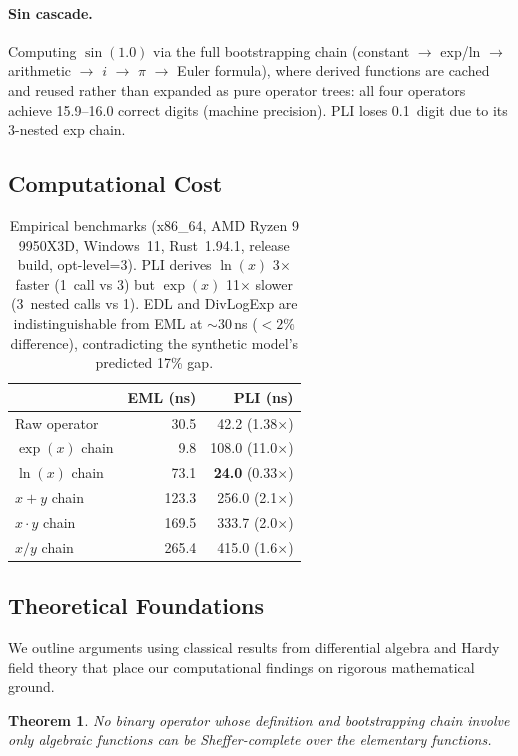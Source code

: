 \documentclass[10pt,twocolumn]{article}
\newtheorem{theorem}{Theorem}
\theoremstyle{remark}
\begin{document}
\paragraph{Sin cascade.} Computing $\sin(1.0)$ via the full bootstrapping chain (constant $\to$ exp/ln $\to$ arithmetic $\to$ $i$ $\to$ $\pi$ $\to$ Euler formula), where derived functions are cached and reused rather than expanded as pure operator trees: all four operators achieve 15.9--16.0 correct digits (machine precision). PLI loses 0.1~digit due to its 3-nested exp chain.

\subsection{Computational Cost}

\begin{table}[h]
\centering
\small
\begin{tabular}{lrr}
\toprule
& EML (ns) & PLI (ns)\\
\midrule
Raw operator & 30.5 & 42.2 (1.38$\times$)\\
$\exp(x)$ chain & 9.8 & 108.0 (11.0$\times$)\\
$\ln(x)$ chain & 73.1 & \textbf{24.0} (0.33$\times$)\\
$x + y$ chain & 123.3 & 256.0 (2.1$\times$)\\
$x \cdot y$ chain & 169.5 & 333.7 (2.0$\times$)\\
$x / y$ chain & 265.4 & 415.0 (1.6$\times$)\\
\bottomrule
\end{tabular}
\caption{Empirical benchmarks (x86\_64, AMD Ryzen 9 9950X3D, Windows~11, Rust~1.94.1, release build, opt-level=3). PLI derives $\ln(x)$ 3$\times$ faster (1~call vs 3) but $\exp(x)$ 11$\times$ slower (3~nested calls vs 1). EDL and DivLogExp are indistinguishable from EML at ${\sim}30$\,ns ($< 2\%$ difference), contradicting the synthetic model's predicted 17\% gap.}
\end{table}

\subsection{Theoretical Foundations}

We outline arguments using classical results from differential algebra and Hardy field theory that place our computational findings on rigorous mathematical ground.

\begin{theorem}\label{thm:expln_necessary}
No binary operator whose definition and bootstrapping chain involve only algebraic functions can be Sheffer-complete over the elementary functions.
\end{theorem}
\end{document}
